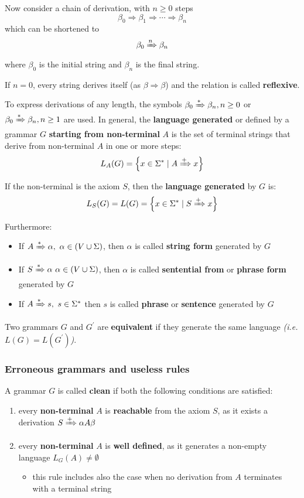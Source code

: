 \documentclass[english]{article}
\begin{document}
Now consider a chain of derivation, with \(n \geq 0\) steps
\[ \beta_0 \Rightarrow \beta_1 \Rightarrow \cdots \Rightarrow \beta_n \]
which can be shortened to
\[ \beta_0 \xRightarrow{n} \beta_n \]
where \(\beta_0\) is the initial string and \(\beta_n\) is the final string.

If \(n = 0\), every string derives itself (as \(\beta \Rightarrow \beta\)) and the relation is called \textbf{reflexive}.

To express derivations of any length, the symbols \(\beta_0 \xRightarrow{\ast} \beta_n, n \geq 0\) or \(\beta_0 \xRightarrow{\ast} \beta_n, n \geq 1\) are used.
In general, the \textbf{language generated} or defined by a grammar \(G\) \textbf{starting from non-terminal} \(A\) is the set of terminal strings that derive from non-terminal \(A\) in one or more steps:
\[ L_A(G) = \left\{x \in \Sigma^\ast \mid A \xRightarrow{+} x \right\} \]

If the non-terminal is the axiom \(S\), then the \textbf{language generated} by \(G\) is:
\[ L_S(G) = L(G) = \left\{x \in \Sigma^\ast \mid S \xRightarrow{+} x \right\} \]

\bigskip
Furthermore:

\begin{itemize}
  \item If \(A \xRightarrow{\ast} \alpha, \ \alpha \in (V \cup \Sigma)\), then \(\alpha\) is called \textbf{string form} generated by \(G\)
  \item If \(S \xRightarrow{\ast} \alpha \ \alpha \in (V \cup \Sigma)\), then \(\alpha\) is called \textbf{sentential from} or \textbf{phrase form} generated by \(G\)
  \item If \(A \xRightarrow{\ast} s, \ s \in \Sigma^\ast\) then \(s\) is called \textbf{phrase} or \textbf{sentence} generated by \(G\)
\end{itemize}

\bigskip
Two grammars \(G\) and \(G^\prime\) are \textbf{equivalent} if they generate the same language \textit{(i.e. \(L(G) = L(G^\prime)\))}.

\subsubsection{Erroneous grammars and useless rules}

A grammar \(G\) is called \textbf{clean} if both the following conditions are satisfied:

\begin{enumerate}
  \item every \textbf{non-terminal} \(A\) is \textbf{reachable} from the axiom \(S\), as it exists a derivation \(S \xRightarrow{+} \alpha A \beta\)
  \item every \textbf{non-terminal} \(A\) is \textbf{well defined}, as it generates a non-empty language \(L_G(A) \neq \emptyset\)
        \begin{itemize}[label=\(\rightarrow\)]
          \item this rule includes also the case when no derivation from \(A\) terminates with a terminal string
        \end{itemize}
\end{enumerate}
\end{document}
